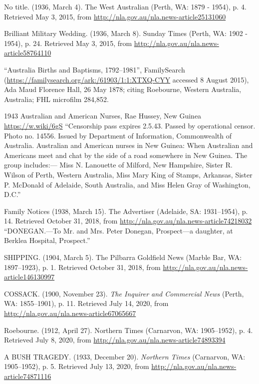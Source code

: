 \begin{thebibliography}{999}
	No title. (1936, March 4). The West Australian (Perth, WA: 1879 - 1954), p. 4.
	Retrieved May 3, 2015, from \url{http://nla.gov.au/nla.news-article25131060}

	Brilliant Military Wedding. (1936, March 8). Sunday Times (Perth, WA: 1902 - 1954), p. 24.
	Retrieved May 3, 2015, from \url{http://nla.gov.au/nla.news-article58764110}

	``Australia Births and Baptisms, 1792--1981'', FamilySearch
	(\url{https://familysearch.org/ark:/61903/1:1:XTXQ-CYY} accessed 8 August 2015),
	Ada Maud Florence Hall, 26 May 1878; citing Roebourne, Western Australia, Australia;
	FHL microfilm 284,852.

    1943 Australian and American Nurses, Rae Hussey, New Guinea \url{https://w.wiki/6gS}
    ``Censorship pass expires 2.5.43. Passed by operational censor. Photo no. 14556.
    Issued by Department of Information, Commonwealth of Australia. Australian and American nurses in New Guinea:
    When Australian and Americans meet and chat by the side of a road somewhere in New Guinea. The group includes:---
    Miss N. Lanouette of Milford, New Hampshire, Sister R. Wilson of Perth, Western Australia,
    Miss Mary King of Stamps, Arkansas, Sister P. McDonald of Adelaide, South Australia,
    and Miss Helen Gray of Washington, D.C.''

    Family Notices (1938, March 15). The Advertiser (Adelaide, SA: 1931--1954), p. 14.
    Retrieved October 31, 2018, from \url{http://nla.gov.au/nla.news-article74218032}
    ``DONEGAN.---To Mr. and Mrs. Peter Donegan, Prospect---a daughter, at Berklea Hospital, Prospect.''

    SHIPPING. (1904, March 5). The Pilbarra Goldfield News (Marble Bar, WA: 1897--1923), p. 1.
    Retrieved October 31, 2018, from \url{http://nla.gov.au/nla.news-article146130997}

	COSSACK. (1900, November 23). \emph{The Inquirer and Commercial News} (Perth, WA: 1855--1901), p. 11.
	Retrieved July 14, 2020, from \url{http://nla.gov.au/nla.news-article67065667}

	Roebourne. (1912, April 27). Northern Times (Carnarvon, WA: 1905--1952), p. 4.
	Retrieved July 8, 2020, from \url{http://nla.gov.au/nla.news-article74893394}

	A BUSH TRAGEDY. (1933, December 20). \emph{Northern Times} (Carnarvon, WA: 1905--1952), p. 5.
	Retrieved July 13, 2020, from \url{http://nla.gov.au/nla.news-article74871116}


\end{thebibliography}
